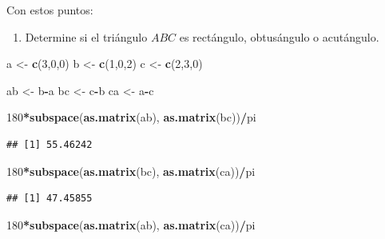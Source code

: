 \documentclass[]{article}
\newenvironment{Shaded}{\begin{snugshade}}{\end{snugshade}}
\newcommand{\DecValTok}[1]{\textcolor[rgb]{0.00,0.00,0.81}{#1}}
\newcommand{\KeywordTok}[1]{\textcolor[rgb]{0.13,0.29,0.53}{\textbf{#1}}}
\newcommand{\NormalTok}[1]{#1}
\newcommand{\OperatorTok}[1]{\textcolor[rgb]{0.81,0.36,0.00}{\textbf{#1}}}
\newcommand{\StringTok}[1]{\textcolor[rgb]{0.31,0.60,0.02}{#1}}
\providecommand{\tightlist}{%
  \setlength{\itemsep}{0pt}\setlength{\parskip}{0pt}}
\begin{document}
Con estos puntos:

\begin{enumerate}
\def\labelenumi{\alph{enumi}.}
\tightlist
\item
  Determine si el triángulo \(ABC\) es rectángulo, obtusángulo o
  acutángulo.
\end{enumerate}

\begin{Shaded}
\begin{Highlighting}[]
\NormalTok{a <-}\StringTok{ }\KeywordTok{c}\NormalTok{(}\DecValTok{3}\NormalTok{,}\DecValTok{0}\NormalTok{,}\DecValTok{0}\NormalTok{)}
\NormalTok{b <-}\StringTok{ }\KeywordTok{c}\NormalTok{(}\DecValTok{1}\NormalTok{,}\DecValTok{0}\NormalTok{,}\DecValTok{2}\NormalTok{)}
\NormalTok{c <-}\StringTok{ }\KeywordTok{c}\NormalTok{(}\DecValTok{2}\NormalTok{,}\DecValTok{3}\NormalTok{,}\DecValTok{0}\NormalTok{)}

\NormalTok{ab <-}\StringTok{ }\NormalTok{b}\OperatorTok{-}\NormalTok{a}
\NormalTok{bc <-}\StringTok{ }\NormalTok{c}\OperatorTok{-}\NormalTok{b}
\NormalTok{ca <-}\StringTok{ }\NormalTok{a}\OperatorTok{-}\NormalTok{c}

\DecValTok{180}\OperatorTok{*}\KeywordTok{subspace}\NormalTok{(}\KeywordTok{as.matrix}\NormalTok{(ab), }\KeywordTok{as.matrix}\NormalTok{(bc))}\OperatorTok{/}\NormalTok{pi}
\end{Highlighting}
\end{Shaded}

\begin{verbatim}
## [1] 55.46242
\end{verbatim}

\begin{Shaded}
\begin{Highlighting}[]
\DecValTok{180}\OperatorTok{*}\KeywordTok{subspace}\NormalTok{(}\KeywordTok{as.matrix}\NormalTok{(bc), }\KeywordTok{as.matrix}\NormalTok{(ca))}\OperatorTok{/}\NormalTok{pi}
\end{Highlighting}
\end{Shaded}

\begin{verbatim}
## [1] 47.45855
\end{verbatim}

\begin{Shaded}
\begin{Highlighting}[]
\DecValTok{180}\OperatorTok{*}\KeywordTok{subspace}\NormalTok{(}\KeywordTok{as.matrix}\NormalTok{(ab), }\KeywordTok{as.matrix}\NormalTok{(ca))}\OperatorTok{/}\NormalTok{pi}
\end{Highlighting}
\end{Shaded}
\end{document}

